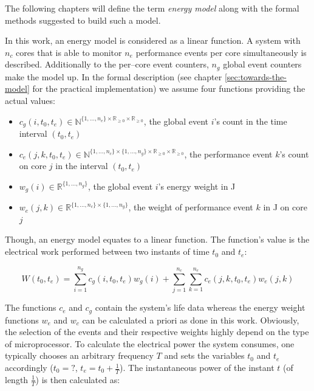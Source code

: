 The following chapters will define the term \emph{energy model} along with  the
formal methods suggested to build such a model.


\label{sec:model-properties}

In this work, an energy model is considered as a linear function. A system with
$n_c$ cores that is able to monitor $n_e$ performance events per core
simultaneously is described. Additionally to the per--core event counters, $n_g$
global event counters make the model up. In the formal description (see chapter
\ref{sec:towards-the-model} for the practical implementation) we assume four
functions providing the actual values:

\begin{itemize}

\item $c_g(i, t_0, t_e) \in \mathbb{N}^{\{1, \ldots, n_e\} \times
\mathbb{R}_{\geq 0} \times \mathbb{R}_{\geq 0}}$, the global event $i$'s count
in the time interval $(t_0, t_e)$

\item $c_e(j, k, t_0, t_e) \in \mathbb{N}^{\{1, \ldots, n_c\} \times
\{1, \ldots, n_g\} \times \mathbb{R}_{\geq 0} \times \mathbb{R}_{\geq 0}}$, the
performance event $k$'s count on core $j$ in the interval $(t_0, t_e)$

\item $w_g(i) \in \mathbb{R}^{\{1, \ldots, n_g\}}$, the global event $i$'s
energy weight in \si{\joule}

\item $w_e(j, k) \in \mathbb{R}^{\{1, \ldots, n_c\} \times \{1, \ldots, n_g\}}$,
the weight of performance event $k$ in \si{\joule} on core $j$

\end{itemize}

Though, an energy model equates to a linear function. The function's value is
the electrical work performed between two instants of time $t_0$ and $t_e$:

\begin{equation}
W(t_0, t_e) = \sum\limits_{i=1}^{n_g} c_g(i, t_0, t_e) w_g(i) +
\sum\limits_{j=1}^{n_c} \sum\limits_{k=1}^{n_e} c_e(j, k, t_0, t_e) w_e(j, k)
\end{equation}

The functions $c_e$ and $c_g$ contain the system's life data whereas the energy
weight functions $w_e$ and $w_c$ can be calculated a priori as done in this
work. Obviously, the selection of the events and their respective weights highly
depend on the type of microprocessor. To calculate the electrical power the
system consumes, one typically chooses an arbitrary frequency $T$ and sets the
variables $t_0$ and $t_e$ accordingly ($t_0 = ?$, $t_e = t_0 + \frac{1}{T}$).
The instantaneous power of the instant $t$ (of length $\frac{1}{T}$) is then
calculated as:

